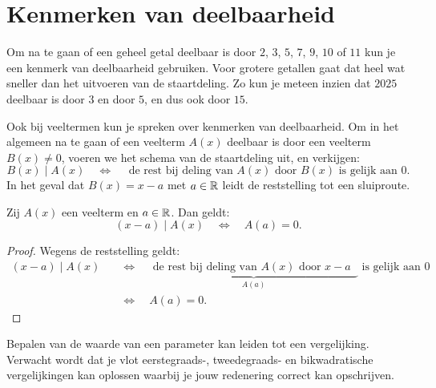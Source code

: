 \documentclass{ximera}
\begin{document}
	\author{Koen de Naeghel - Wiskunde Op Maat}



	\section{Kenmerken van deelbaarheid} 

	Om na te gaan of een geheel getal deelbaar is door $2$, $3$, $5$, $7$, $9$, $10$ of $11$ kun je een kenmerk van deelbaarheid gebruiken. Voor grotere getallen gaat dat heel wat sneller dan het uitvoeren van de staartdeling. Zo kun je meteen inzien dat $2025$ deelbaar is door $3$ en door $5$, en dus ook door $15$.  
	
	Ook bij veeltermen kun je spreken over kenmerken van deelbaarheid. Om in het algemeen na te gaan of een veelterm $A(x)$ deelbaar is door een veelterm $B(x) \neq 0$, voeren we het schema van de staartdeling uit, en verkijgen:
	\[
	B(x) \mid A(x) \quad \Leftrightarrow \quad \text{ de rest bij deling van $A(x)$ door $B(x)$ is gelijk aan $0$.}
	\] 
	In het geval dat $B(x) = x-a$ met $a \in \mathbb{R}$ leidt de reststelling tot een sluiproute.
	
	\begin{theorem} 
	Zij $A(x)$ een veelterm en $a \in \mathbb{R}$. Dan geldt:
	\[
	(x-a) \mid A(x) \quad \Leftrightarrow \quad A(a) = 0.
	\]
	\end{theorem} 
	
	
	\begin{proof}
	
	Wegens de reststelling geldt:
	\begin{align}
	(x-a) \mid A(x) \quad 
	& \Leftrightarrow \quad \underbrace{\text{ de rest bij deling van $A(x)$ door $x-a$ }}_{A(a)} \text{ is gelijk aan $0$} \nonumber \\
	& \Leftrightarrow \quad A(a) = 0. \tag*{\qedhere}
	\end{align}
	
	\end{proof}
	
	
	Bepalen van de waarde van een parameter kan leiden tot een vergelijking. Verwacht wordt dat je vlot eerstegraads-, tweedegraads- en bikwadratische vergelijkingen kan oplossen waarbij je jouw redenering correct kan opschrijven. 
	
\end{document}
